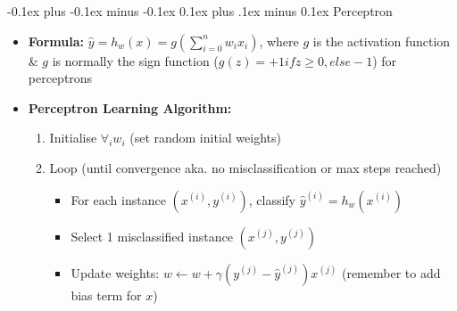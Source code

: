 \documentclass[landscape]{article}
\makeatletter
\renewcommand{\subsection}{\@startsection{subsection}{2}{0mm}%
  {-0.1ex plus -0.1ex minus -0.1ex}%
  {0.1ex plus .1ex minus 0.1ex}%
{\normalfont\scriptsize\bfseries}}
\makeatother
\begin{document}
\begin{multicols*}{5}
        \subsection{Perceptron}
        \begin{itemize}
          \item \textbf{Formula:} $\hat{y} = h_w(x) = g(\sum_{i=0}^n w_ix_i)$, where $g$ is the activation function \& $g$ is normally the sign function ($g(z) = +1 if z \geq 0, else -1$) for perceptrons
          \item \textbf{Perceptron Learning Algorithm:}
          \begin{enumerate}
            \item Initialise $\forall_iw_i$ (set random initial weights)
            \item Loop (until convergence aka. no misclassification or max steps reached)
            \begin{itemize}
              \item For each instance $(x^{(i)}, y^{(i)})$, classify $\hat{y}^{(i)} = h_w(x^{(i)})$
              \item Select 1 misclassified instance $(x^{(j)}, y^{(j)})$
              \item Update weights: $w \leftarrow w + \gamma(y^{(j)} - \hat{y}^{(j)})x^{(j)}$ (remember to add bias term for $x$)
            \end{itemize}
          \end{enumerate}
        \end{itemize}


\end{multicols*}
\end{document}
